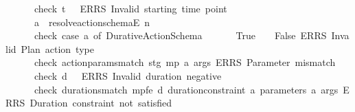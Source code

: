 \begin{isabellebody}
\ \ \ \ \ \ check\ {\isacharparenleft}{\kern0pt}t\isactrlsub {\isasympi}\ {\isasymge}\ {}{\isacharparenright}{\kern0pt}\ {\isacharparenleft}{\kern0pt}ERRS\ {\isacharprime}{\kern0pt}{\isacharprime}{\kern0pt}Invalid\ starting\ time\ point{\isacharprime}{\kern0pt}{\isacharprime}{\kern0pt}{\isacharparenright}{\kern0pt}{\isacharsemicolon}{\kern0pt}\isanewline
\ \ \ \ \ \ a\ {\isasymleftarrow}\ resolve{\isacharunderscore}{\kern0pt}action{\isacharunderscore}{\kern0pt}schemaE\ n{\isacharsemicolon}{\kern0pt}\isanewline
\ \ \ \ \ \ check\ {\isacharparenleft}{\kern0pt}case\ a\ of\ Durative{\isacharunderscore}{\kern0pt}Action{\isacharunderscore}{\kern0pt}Schema\ {\isacharunderscore}{\kern0pt}\ {\isacharunderscore}{\kern0pt}\ {\isacharunderscore}{\kern0pt}\ {\isacharunderscore}{\kern0pt}\ {\isacharunderscore}{\kern0pt}\ {\isasymRightarrow}\ True\ {\isacharbar}{\kern0pt}\ {\isacharunderscore}{\kern0pt}\ {\isasymRightarrow}\ False{\isacharparenright}{\kern0pt}\ {\isacharparenleft}{\kern0pt}ERRS\ {\isacharprime}{\kern0pt}{\isacharprime}{\kern0pt}Invalid\ Plan\ action\ type{\isacharprime}{\kern0pt}{\isacharprime}{\kern0pt}{\isacharparenright}{\kern0pt}{\isacharsemicolon}{\kern0pt}\isanewline
\ \ \ \ \ \ check\ {\isacharparenleft}{\kern0pt}action{\isacharunderscore}{\kern0pt}params{\isacharunderscore}{\kern0pt}match{}\ stg\ mp\ a\ args{\isacharparenright}{\kern0pt}\ {\isacharparenleft}{\kern0pt}ERRS\ {\isacharprime}{\kern0pt}{\isacharprime}{\kern0pt}Parameter\ mismatch{\isacharprime}{\kern0pt}{\isacharprime}{\kern0pt}{\isacharparenright}{\kern0pt}{\isacharsemicolon}{\kern0pt}\isanewline
\ \ \ \ \ \ check\ {\isacharparenleft}{\kern0pt}d\ {\isasymge}\ {}{\isacharparenright}{\kern0pt}\ {\isacharparenleft}{\kern0pt}ERRS\ {\isacharprime}{\kern0pt}{\isacharprime}{\kern0pt}Invalid\ duration\ {\isacharparenleft}{\kern0pt}negative{\isacharparenright}{\kern0pt}{\isacharprime}{\kern0pt}{\isacharprime}{\kern0pt}{\isacharparenright}{\kern0pt}{\isacharsemicolon}{\kern0pt}\isanewline
\ \ \ \ \ \ check\ {\isacharparenleft}{\kern0pt}durations{\isacharunderscore}{\kern0pt}match{\isacharprime}{\kern0pt}\ mp{\isacharunderscore}{\kern0pt}fe\ d\ {\isacharparenleft}{\kern0pt}duration{\isacharunderscore}{\kern0pt}constraint\ a{\isacharparenright}{\kern0pt}\ {\isacharparenleft}{\kern0pt}parameters\ a{\isacharparenright}{\kern0pt}\ args{\isacharparenright}{\kern0pt}\ {\isacharparenleft}{\kern0pt}ERRS\ {\isacharprime}{\kern0pt}{\isacharprime}{\kern0pt}Duration\ constraint\ not\ satisfied{\isacharprime}{\kern0pt}{\isacharprime}{\kern0pt}{\isacharparenright}{\kern0pt}{\isacharsemicolon}{\kern0pt}\isanewline

\end{isabellebody}
